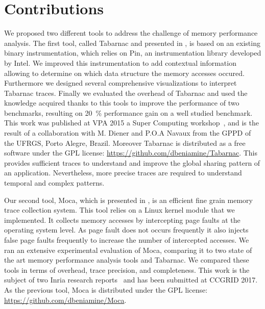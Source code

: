 \section{Contributions}

We proposed two different tools to address the challenge of memory performance analysis.
The first tool, called \gls{Tabarnac} and presented in , is based on an existing binary instrumentation, which relies on \gls{Pin}, an instrumentation library developed by \gls{Intel}.
We improved this instrumentation to add contextual information allowing to determine on which data structure the memory accesses occured.
Furthermore we designed several comprehensive visualizations to interpret \gls{Tabarnac} traces.
Finally we evaluated the overhead of \gls{Tabarnac} and used the knowledge acquired thanks to this tools to improve the performance of two benchmarks, resulting on \SI{20}{\%} performance gain on a well studied benchmark.
This work was published at \gls{VPA} 2015 a Super Computing workshop~\cite{Beniamine15TABARNAC}, and is the result of a collaboration with M. Diener and P.O.A Navaux from the \gls{GPPD} of the \gls{UFRGS}, Porto Alegre, Brazil.
Moreover \gls{Tabarnac} is distributed as a free software under the \gls{GPL} license: \url{https://github.com/dbeniamine/Tabarnac}.
This provides sufficient traces to understand and improve the global sharing pattern of an application.
Nevertheless, more precise traces are required to understand temporal and complex patterns.

Our second tool, \gls{Moca}, which is presented in , is an efficient fine grain memory trace collection system.
This tool relies on a \gls{Linux} kernel module that we implemented.
It collects memory accesses by intercepting page faults at the operating system level.
As page fault does not occurs frequently it also injects false page faults frequently to increase the number of intercepted accesses.
We ran an extensive experimental evaluation of \gls{Moca}, comparing it to two state of the art memory performance analysis tools and \gls{Tabarnac}.
We compared these tools in terms of overhead, trace precision, and completeness.
This work is the subject of two Inria research reports~\cite{Beniamine15Memory,Beniamine16Moca} and has been submitted at \gls{CCGRID} 2017.
As the previous tool, \gls{Moca} is distributed under the \gls{GPL} license: \url{https://github.com/dbeniamine/Moca}.

